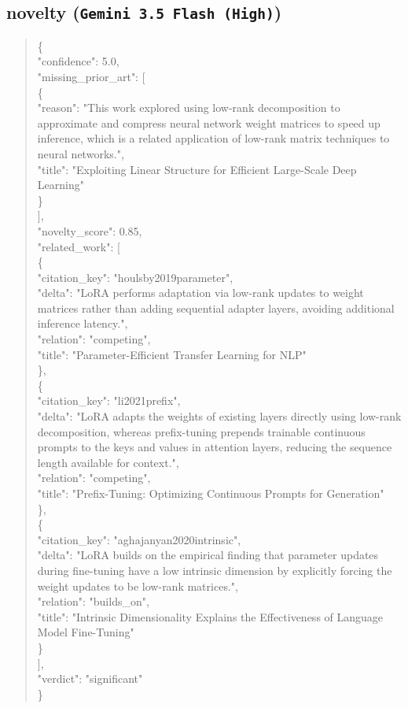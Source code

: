 \documentclass[11pt]{article}
\begin{document}
\subsection*{novelty (\texttt{Gemini 3.5 Flash (High)})}
\begin{quote}\small\ttfamily\raggedright
\{\\
  "confidence": 5.0,\\
  "missing\_prior\_art": [\\
    \{\\
      "reason": "This work explored using low-rank decomposition to approximate and compress neural network weight matrices to speed up inference, which is a related application of low-rank matrix techniques to neural networks.",\\
      "title": "Exploiting Linear Structure for Efficient Large-Scale Deep Learning"\\
    \}\\
  ],\\
  "novelty\_score": 0.85,\\
  "related\_work": [\\
    \{\\
      "citation\_key": "houlsby2019parameter",\\
      "delta": "LoRA performs adaptation via low-rank updates to weight matrices rather than adding sequential adapter layers, avoiding additional inference latency.",\\
      "relation": "competing",\\
      "title": "Parameter-Efficient Transfer Learning for NLP"\\
    \},\\
    \{\\
      "citation\_key": "li2021prefix",\\
      "delta": "LoRA adapts the weights of existing layers directly using low-rank decomposition, whereas prefix-tuning prepends trainable continuous prompts to the keys and values in attention layers, reducing the sequence length available for context.",\\
      "relation": "competing",\\
      "title": "Prefix-Tuning: Optimizing Continuous Prompts for Generation"\\
    \},\\
    \{\\
      "citation\_key": "aghajanyan2020intrinsic",\\
      "delta": "LoRA builds on the empirical finding that parameter updates during fine-tuning have a low intrinsic dimension by explicitly forcing the weight updates to be low-rank matrices.",\\
      "relation": "builds\_on",\\
      "title": "Intrinsic Dimensionality Explains the Effectiveness of Language Model Fine-Tuning"\\
    \}\\
  ],\\
  "verdict": "significant"\\
\}\\
\end{quote}
\end{document}
